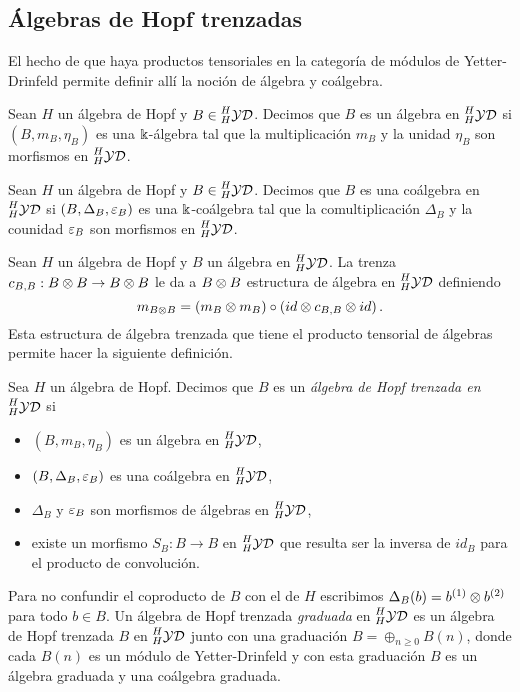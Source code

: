 \documentclass[a4paper,oneside,fleqn,11pt,../tesis.tex]{subfiles}
\newcommand{\yetter}{\prescript{H}{H}{\mathcal{YD}}}
\begin{document}
\subsection{Álgebras de Hopf trenzadas}
El hecho de que haya productos tensoriales en la categoría de módulos de Yetter-Drinfeld permite definir allí la noción de álgebra y coálgebra.

\begin{definition}
	Sean $H$ un álgebra de Hopf y $B \in \yetter$. Decimos que $B$ es un álgebra en $\yetter$ si $\left(B,m_B,\eta_B\right)$ es una $\Bbbk$-álgebra
	tal que la multiplicación $m_B$ y la unidad $\eta_B$ son morfismos en $\yetter$.
\end{definition}

\begin{definition}
	Sean $H$ un álgebra de Hopf y $B \in \yetter$. Decimos que $B$ es una coálgebra en $\yetter$ si
	$\left(B,\Delta_B,\varepsilon_B\right)$ es una $\Bbbk$-coálgebra
	tal que la comultiplicación $\Delta_B$ y la counidad $\varepsilon_B$ son morfismos en $\yetter$.
\end{definition}

Sean $H$ un álgebra de Hopf y $B$ un álgebra en $\yetter$.  La trenza $c_{B, B}: B \otimes B \to B \otimes B$ le da a $B \otimes B$ estructura de álgebra en $\yetter$ definiendo
\[
	m_{B \otimes B} = \left(m_B \otimes m_B \right) \circ \left(id \otimes c_{B, B} \otimes id \right).
\]
Esta estructura de álgebra trenzada que tiene el producto tensorial de álgebras permite hacer la siguiente definición.

\begin{definition}
	Sea $H$ un álgebra de Hopf. Decimos que $B$ es un \emph{álgebra de Hopf trenzada en $\yetter$} si
	\begin{itemize}
	\item $\left(B, m_B, \eta_B\right)$ es un álgebra en $\yetter$,
	\item $\left(B, \Delta_B, \varepsilon_B \right)$ es una coálgebra en $\yetter$,
	\item $\Delta_B$ y $\varepsilon_B$ son morfismos de álgebras en $\yetter$,
	\item existe un morfismo $S_B:B \to B$ en $\yetter$ que resulta ser la inversa de $id_B$
	para el producto de convolución.	
	\end{itemize}
	Para no confundir el coproducto de $B$ con el de $H$ escribimos $\Delta_B(b) = b^{(1)}\otimes b^{(2)}$ para todo $b \in B$.
	Un álgebra de Hopf trenzada \emph{graduada} en $\yetter$ es un álgebra de Hopf trenzada $B$ en $\yetter$ junto
	con una graduación $B = \oplus_{n \geq 0}B(n)$, donde cada $B(n)$ es un módulo de Yetter-Drinfeld y con esta 
	graduación $B$ es un álgebra graduada y una coálgebra graduada.
\end{definition}
\end{document}
